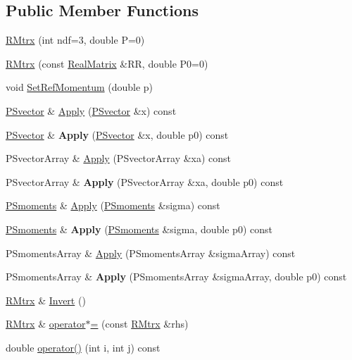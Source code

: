 \subsection*{Public Member Functions}
\begin{DoxyCompactItemize}
\item 
\hyperlink{classRMtrx_a032c49c9e214bc5547f1f8905b90c0a7}{R\+Mtrx} (int ndf=3, double P=0)
\item 
\hyperlink{classRMtrx_af3e573feaa7716ab2e3359d1ed5553e9}{R\+Mtrx} (const \hyperlink{classTLAS_1_1Matrix}{Real\+Matrix} \&RR, double P0=0)
\item 
void \hyperlink{classRMtrx_ad5947ad3a111cb9b72ca3ae2e3fff35b}{Set\+Ref\+Momentum} (double p)
\item 
\hyperlink{classPSvector}{P\+Svector} \& \hyperlink{classRMtrx_a8c7db2715f9264ca496c3bbc830653ac}{Apply} (\hyperlink{classPSvector}{P\+Svector} \&x) const
\item 
\mbox{\label{classRMtrx_afcfe247b08330a88da8ec65ec1be2a6a}} 
\hyperlink{classPSvector}{P\+Svector} \& {\bfseries Apply} (\hyperlink{classPSvector}{P\+Svector} \&x, double p0) const
\item 
P\+Svector\+Array \& \hyperlink{classRMtrx_a46df04852afc2eccc36360ea5a3a3826}{Apply} (P\+Svector\+Array \&xa) const
\item 
\mbox{\label{classRMtrx_ac160408e3e173197cc36835a54c54eab}} 
P\+Svector\+Array \& {\bfseries Apply} (P\+Svector\+Array \&xa, double p0) const
\item 
\hyperlink{classTPSMoments}{P\+Smoments} \& \hyperlink{classRMtrx_a563c6861facf2b7147575ab0921357d8}{Apply} (\hyperlink{classTPSMoments}{P\+Smoments} \&sigma) const
\item 
\mbox{\label{classRMtrx_a83d49550b5dff3ab2ceb53c11032fac8}} 
\hyperlink{classTPSMoments}{P\+Smoments} \& {\bfseries Apply} (\hyperlink{classTPSMoments}{P\+Smoments} \&sigma, double p0) const
\item 
P\+Smoments\+Array \& \hyperlink{classRMtrx_a3d1ab14e965dbadccf16040a28cb6911}{Apply} (P\+Smoments\+Array \&sigma\+Array) const
\item 
\mbox{\label{classRMtrx_a0fc070459cafa48863cfb562cddbcd3e}} 
P\+Smoments\+Array \& {\bfseries Apply} (P\+Smoments\+Array \&sigma\+Array, double p0) const
\item 
\hyperlink{classRMtrx}{R\+Mtrx} \& \hyperlink{classRMtrx_aec48b145bf3d175a14026d04fe3eb23c}{Invert} ()
\item 
\hyperlink{classRMtrx}{R\+Mtrx} \& \hyperlink{classRMtrx_a8d08b2c62149ffd5309b9cfb3783a8cd}{operator$\ast$=} (const \hyperlink{classRMtrx}{R\+Mtrx} \&rhs)
\item 
double \hyperlink{classRMtrx_a1cb4e9e7e00137f95f0a5b1511d0344e}{operator()} (int i, int j) const
\end{DoxyCompactItemize}
